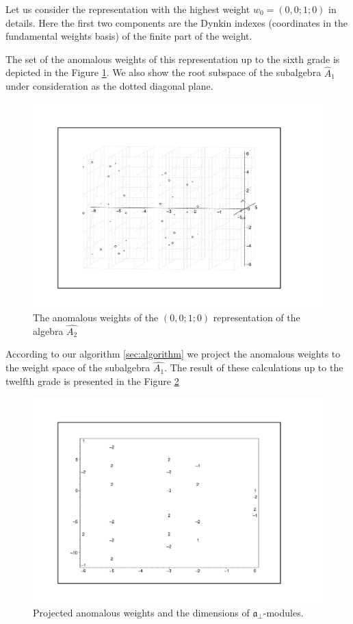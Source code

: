 \documentclass[a4paper,12pt]{article}
\theoremstyle{definition} \newtheorem{Def}{Definition}
\begin{document}
Let us consider the representation with the highest weight $w_0=(0,0;1;0)$ in details. Here the first two components are the Dynkin indexes (coordinates in the fundamental weights basis) of the finite part of the weight.

The set of the anomalous weights of this representation up to the sixth grade is depicted in the Figure \ref{fig:affine_A2_anom_point}. We also show the root subspace of the subalgebra $\hat{A}_1$ under consideration as the dotted diagonal plane.

\begin{figure}[h!tb]
  \centering
  \includegraphics[width=180mm]{AffineA2_A1_anom.pdf}
  \caption{The anomalous weights of the $(0,0;1;0)$ representation of the algebra $\hat{A_2}$}
  \label{fig:affine_A2_anom_point}
\end{figure}

According to our algorithm \ref{sec:algorithm} we project the anomalous weights to the weight space of the subalgebra $\hat{A_1}$.
The result of these calculations up to the twelfth grade is presented in the Figure \ref{fig:AffineA2_A1_anom_proj}
\begin{figure}[h!tb]
  \centering
  \includegraphics[width=150mm]{AffineA2_A1_proj_anom.pdf}
  \caption{Projected anomalous weights and the dimensions of $\mathfrak{a}_{\bot}$-modules.}
  \label{fig:AffineA2_A1_anom_proj}
\end{figure}
\end{document}
